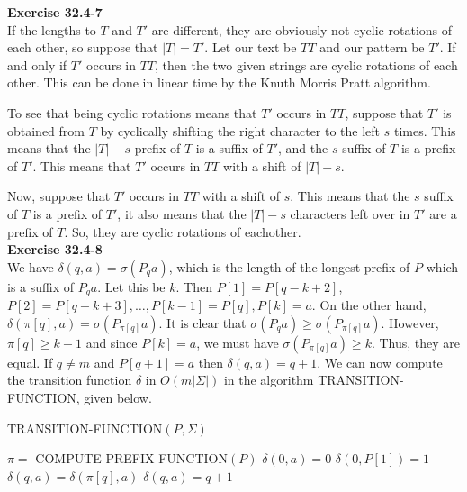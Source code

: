 \documentclass{article}
\begin{document}
\noindent\textbf{Exercise 32.4-7}\\

If the lengths to $T$ and $T'$ are different, they are obviously not cyclic rotations of each other, so suppose that $|T|=T'$. Let our text be $TT$ and our pattern be $T'$. If and only if $T'$ occurs in $TT$, then the two given strings are cyclic rotations of each other. This can be done in linear time by the Knuth Morris Pratt algorithm.

To see that being cyclic rotations means that $T'$ occurs in $TT$, suppose that $T'$ is obtained from $T$ by cyclically shifting the right character to the left $s$ times. This means that the $|T|-s$ prefix of $T$ is a suffix of $T'$, and the $s$ suffix of $T$ is a prefix of $T'$. This means that $T'$ occurs in $TT$ with a shift of $|T|-s$.

Now, suppose that $T'$ occurs in $TT$ with a shift of $s$. This means that the $s$ suffix of $T$ is a prefix of $T'$, it also means that the $|T|-s$ characters left over in $T'$ are a prefix of $T$. So, they are cyclic rotations of eachother.\\

\noindent\textbf{Exercise 32.4-8}\\

We have $\delta(q,a) = \sigma(P_qa)$, which is the length of the longest prefix of $P$ which is a suffix of $P_q a$.  Let this be $k$.  Then $P[1] = P[q-k+2]$, $P[2] = P[q-k+3], \ldots, P[k-1] = P[q], P[k] = a$.  On the other hand, $\delta(\pi[q],a) = \sigma(P_{\pi[q]}a)$.  It is clear that $\sigma(P_q a) \geq \sigma(P_{\pi[q]}a)$.  However, $\pi[q] \geq k-1$ and since $P[k] = a$, we must have $\sigma(P_{\pi[q]}a) \geq k$.  Thus, they are equal.   If $q \neq m$ and $P[q+1] = a$ then $\delta(q,a) = q+1$.  We can now compute the transition function $\delta$ in $O(m|\Sigma|)$ in the algorithm TRANSITION-FUNCTION, given below. \\

\begin{algorithm}
\caption{TRANSITION-FUNCTION$(P,\Sigma)$}
\begin{algorithmic}
\State $\pi = $ COMPUTE-PREFIX-FUNCTION$(P)$
	\State $\delta(0,a) = 0$
\EndFor
\State $\delta(0,P[1]) = 1$
			\State $\delta(q,a) = \delta(\pi[q],a)$
		\Else
			\State $\delta(q,a) = q+1$
		\EndIf
	\EndFor
\EndFor
\end{algorithmic}
\end{algorithm}
\end{document}
